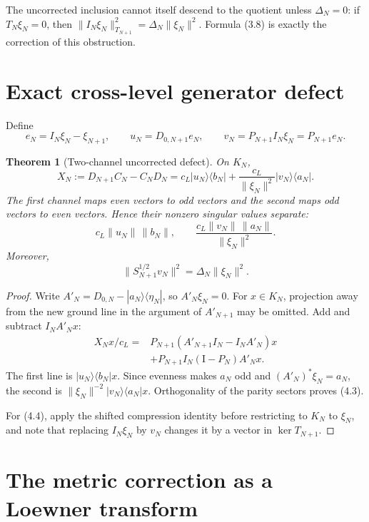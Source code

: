 \documentclass[11pt]{amsart}
\newtheorem{theorem}{Theorem}[section]
\theoremstyle{definition}
\theoremstyle{remark}
\newcommand{\id}{\mathrm I}
\begin{document}
The uncorrected inclusion cannot itself descend to the quotient unless
\(\Delta_N=0\): if \(T_N\xi_N=0\), then
\(\|I_N\xi_N\|_{T_{N+1}}^2=\Delta_N\|\xi_N\|^2\).  Formula (3.8) is exactly
the correction of this obstruction.

\section{Exact cross-level generator defect}
\label{sec:defect}

Define
\[
 e_N=I_N\xi_N-\xi_{N+1},\qquad
 u_N=D_{0,N+1}e_N,\qquad
 v_N=P_{N+1}I_N\xi_N=P_{N+1}e_N.
\tag{4.1}
\]

\begin{theorem}[Two-channel uncorrected defect]
On \(K_N\),
\[
\boxed{
 X_N:=D_{N+1}C_N-C_ND_N
 =c_L|u_N\rangle\langle b_N|
  +\frac{c_L}{\|\xi_N\|^2}|v_N\rangle\langle a_N|.}
\tag{4.2}
\]
The first channel maps even vectors to odd vectors and the second maps odd
vectors to even vectors.  Hence their nonzero singular values separate:
\[
 c_L\|u_N\|\,\|b_N\|,
 \qquad
 \frac{c_L\|v_N\|\,\|a_N\|}{\|\xi_N\|^2}.
\tag{4.3}
\]
Moreover,
\[
\boxed{\|S_{N+1}^{1/2}v_N\|^2
       =\Delta_N\|\xi_N\|^2.}
\tag{4.4}
\]
\end{theorem}

\begin{proof}
Write \(A'_N=D_{0,N}-|a_N\rangle\langle\eta_N|\), so
\(A'_N\xi_N=0\).  For \(x\in K_N\), projection away from the new ground
line in the argument of \(A'_{N+1}\) may be omitted.  Add and subtract
\(I_NA'_Nx\):
\[
\begin{aligned}
X_Nx/c_L
={}&P_{N+1}(A'_{N+1}I_N-I_NA'_N)x\\
 &+P_{N+1}I_N(\id-P_N)A'_Nx.
\end{aligned}
\]
The first line is \(|u_N\rangle\langle b_N|x\).  Since evenness makes
\(a_N\) odd and \((A'_N)^*\xi_N=a_N\), the second is
\(\|\xi_N\|^{-2}|v_N\rangle\langle a_N|x\).  Orthogonality of the parity
sectors proves (4.3).

For (4.4), apply the shifted compression identity before restricting to
\(K_N\) to \(\xi_N\), and note that replacing \(I_N\xi_N\) by \(v_N\)
changes it by a vector in \(\ker T_{N+1}\).
\end{proof}

\section{The metric correction as a Loewner transform}
\label{sec:loewner}
\end{document}
